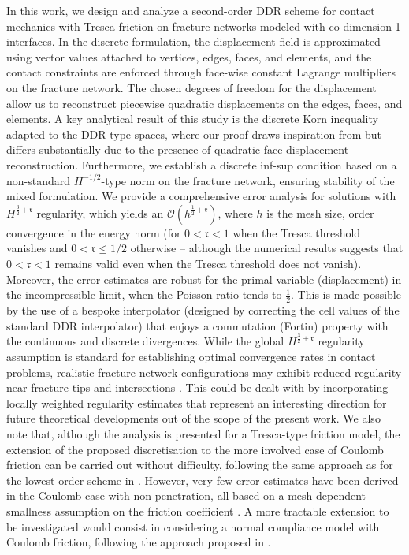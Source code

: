 \documentclass[a4paper,11pt]{article}
\theoremstyle{definition}
\theoremstyle{remark}
\def\fr{\mathfrak{r}}
\begin{document}
In this work, we design and analyze a second-order DDR scheme for contact mechanics with Tresca friction on fracture networks modeled with co-dimension 1 interfaces. In the discrete formulation, the displacement field is approximated using vector values attached to vertices, edges, faces, and elements, and the contact constraints are enforced through face-wise constant Lagrange multipliers on the fracture network. The chosen degrees of freedom for the displacement allow us to reconstruct piecewise quadratic displacements on the edges, faces, and elements.
A key analytical result of this study is the discrete Korn inequality adapted to the DDR-type spaces, where our proof draws inspiration from \cite{jhr} but differs substantially due to the presence of quadratic face displacement reconstruction. Furthermore, we establish a discrete inf-sup condition based on a non-standard $H^{-1/2}$-type norm on the fracture network, ensuring stability of the mixed formulation. We provide a comprehensive error analysis for solutions with $H^{\frac32+\fr}$ regularity, which yields an $\mathcal O(h^{\frac{1}{2}+\fr})$, where $h$ is the mesh size, order convergence in the energy norm (for $0< \fr<1$ when the Tresca threshold vanishes and $0< \fr\le 1/2$ otherwise -- although the numerical results suggests that $0< \fr<1$ remains valid even when the Tresca threshold does not vanish). Moreover, the error estimates are robust for the primal variable (displacement) in the incompressible limit, when the Poisson ratio tends to $\frac{1}{2}$. This is made possible by the use of a bespoke interpolator (designed by correcting the cell values of the standard DDR interpolator) that enjoys a commutation (Fortin) property with the continuous and discrete divergences. While the global $H^{\frac32+\fr}$ regularity assumption is standard for establishing optimal convergence rates in contact problems, realistic fracture network configurations may exhibit reduced regularity near fracture tips and intersections \cite{Dauge1988}. This could be dealt with by incorporating locally weighted regularity estimates that represent an interesting direction for future theoretical developments out of the scope of the present work.
We also note that, although the analysis is presented for a Tresca-type friction model, the extension of the proposed discretisation to the more involved case of Coulomb friction can be carried out without difficulty, following the same approach as for the lowest-order scheme in \cite{droniou2023bubble}. However, very few error estimates have been derived in the Coulomb case with non-penetration, all based on a mesh-dependent smallness assumption on the friction coefficient \cite{Hild2012}. A more tractable extension to be investigated would consist in considering a normal compliance model with Coulomb friction, following the approach proposed in \cite{Wang21}.
\end{document}
